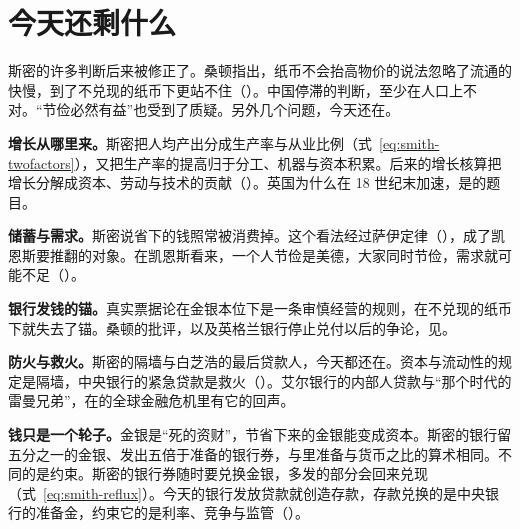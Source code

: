\section{今天还剩什么}\label{sec:smith-legacy}

斯密的许多判断后来被修正了。桑顿指出，纸币不会抬高物价的说法忽略了流通的快慢，到了不兑现的纸币下更站不住（）。中国停滞的判断，至少在人口上不对。“节俭必然有益”也受到了质疑。另外几个问题，今天还在。

\textbf{增长从哪里来。}斯密把人均产出分成生产率与从业比例（式~\eqref{eq:smith-twofactors}），又把生产率的提高归于分工、机器与资本积累。后来的增长核算把增长分解成资本、劳动与技术的贡献（）。英国为什么在 18 世纪末加速，是的题目。

\textbf{储蓄与需求。}斯密说省下的钱照常被消费掉。这个看法经过萨伊定律（），成了凯恩斯要推翻的对象。在凯恩斯看来，一个人节俭是美德，大家同时节俭，需求就可能不足（）。

\textbf{银行发钱的锚。}真实票据论在金银本位下是一条审慎经营的规则，在不兑现的纸币下就失去了锚。桑顿的批评，以及英格兰银行停止兑付以后的争论，见。

\textbf{防火与救火。}斯密的隔墙与白芝浩的最后贷款人，今天都还在。资本与流动性的规定是隔墙，中央银行的紧急贷款是救火（）。艾尔银行的内部人贷款与“那个时代的雷曼兄弟”，在的全球金融危机里有它的回声。

\textbf{钱只是一个轮子。}金银是“死的资财”，节省下来的金银能变成资本。斯密的银行留五分之一的金银、发出五倍于准备的银行券，与里准备与货币之比的算术相同。不同的是约束。斯密的银行券随时要兑换金银，多发的部分会回来兑现（式~\eqref{eq:smith-reflux}）。今天的银行发放贷款就创造存款，存款兑换的是中央银行的准备金，约束它的是利率、竞争与监管（）。

